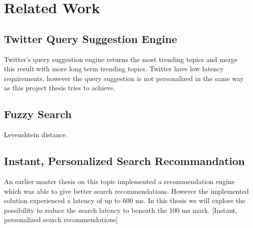 \chapter{Related Work}

\section{Twitter Query Suggestion Engine}

Twitter’s query suggestion engine \cite{twitter-suggestion} returns the most trending topics and merge this result with more long term trending topics.
Twitter have low latency requirements, however the query suggestion is not personalized in the same way as this project thesis tries to achieve.

\section{Fuzzy Search}
Levenshtein distance.

\section{Instant, Personalized Search Recommandation}
An earlier master thesis on this topic implemented a recommendation engine which was able to give better search recommendations.
However the implemented solution experienced a latency of up to 600 ms.
In this thesis we will explore the possibility to reduce the search latency to beneath the 100 ms mark. [Instant, personalized search recommendations]

